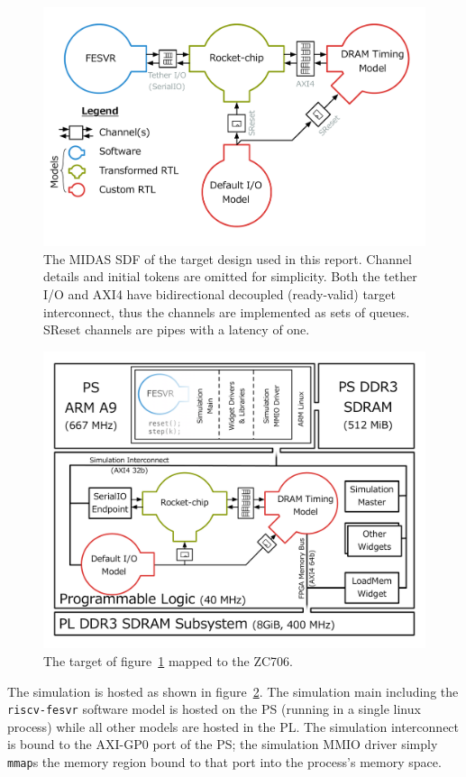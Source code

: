 \begin{figure}
	\centering
	\includegraphics[width=\textwidth]{figures/masters-target.pdf}
    \caption{The MIDAS SDF of the target design used in this report. Channel
    details and initial tokens are omitted for simplicity. Both the tether I/O
    and AXI4 have bidirectional decoupled (ready-valid) target interconnect,
    thus the channels are implemented as sets of queues. SReset channels are pipes with
    a latency of one.}
	\label{fig:default-target}
\end{figure}

\begin{figure}
	\centering
	\includegraphics[width=\textwidth]{figures/hosted-masters-target.pdf}
    \caption{The target of figure~\ref{fig:default-target} mapped to the ZC706.}
	\label{fig:hosted-masters-target}
\end{figure}

The simulation is hosted as shown in figure~\ref{fig:hosted-masters-target}.
The simulation main including the \texttt{riscv-fesvr} software model is hosted
on the PS (running in a single linux process) while all other models are hosted
in the PL. The simulation interconnect is bound to the AXI-GP0 port of the PS;
the simulation MMIO driver simply \texttt{mmap}s the memory region bound to that port
into the process's memory space.
